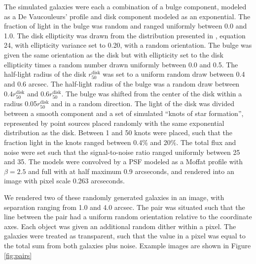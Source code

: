 \documentclass[iop, appendixfloats, numberedappendix, apj]{emulateapj}
\begin{document}
The simulated galaxies were each a combination of a bulge component, modeled as
a De Vaucouleurs' profile \citep{devauc1948} and disk component modeled as an
exponential. The fraction of light in the bulge was random and ranged uniformly
between 0.0 and 1.0. The disk ellipticity was drawn from the distribution
presented in \cite{ba14}, equation 24, with ellipticity variance set to 0.20,
with a random orientation. The bulge was given the same orientation as the disk
but with ellipticity set to the disk ellipticity times a random number drawn
uniformly between 0.0 and 0.5. The half-light radius of the disk
$r_{50}^{\mathrm{disk}}$ was set to a uniform random draw between 0.4 and 0.6
arcsec. The half-light radius of the bulge was a random draw between $0.4
r_{50}^{\mathrm{disk}}$ and $0.6 r_{50}^{\mathrm{disk}}$. The bulge was shifted
from the center of the disk within a radius 0.05$r_{50}^{\mathrm{disk}}$ and in
a random direction. The light of the disk was divided between a smooth
component and a set of simulated ``knots of star formation'', represented by
point sources placed randomly with the same exponential distribution as the
disk.  Between 1 and 50 knots were placed, such that the fraction light in the
knots ranged between 0.4\% and 20\%. The total flux and noise were set such
that the signal-to-noise ratio ranged uniformly between 25 and 35.  The models
were convolved by a PSF modeled as a Moffat profile with $\beta=2.5$ and full
with at half maximum 0.9 arcseconds, and rendered into an image with pixel
scale 0.263 arcseconds.

We rendered two of these randomly generated galaxies in an image, with
separation ranging from 1.0 and 4.0 arcsec. The pair was situated such that the
line between the pair had a uniform random orientation relative to the
coordinate axes. Each object was given an additional random dither within a
pixel. The galaxies were treated as transparent, such that the value in a pixel
was equal to the total sum from both galaxies plus noise. Example images are
shown in Figure \ref{fig:pairs}
\end{document}
